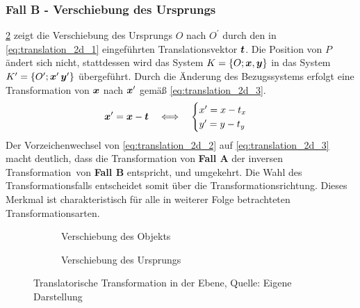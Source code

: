 \subsubsection{Fall B - Verschiebung des Ursprungs}
\cref{fig:translation_2d_b} zeigt die Verschiebung des Ursprungs $O$ nach $O^\prime$ durch den in \cref{eq:translation_2d_1} eingeführten Translationsvektor $\boldsymbol{t}$. Die Position von $P$ ändert sich nicht, stattdessen wird das System $K = \{O;\boldsymbol{x},\boldsymbol{y}\}$ in das System $K^\prime = \{O^\prime;\boldsymbol{x}^\prime\,\boldsymbol{y}^\prime\}$ übergeführt. Durch die Änderung des Bezugssystems erfolgt eine Transformation von $\boldsymbol{x}$ nach $\boldsymbol{x}^\prime$ gemäß \cref{eq:translation_2d_3}.
\begin{equation}
    \boldsymbol{x}^\prime = \boldsymbol{x}-\boldsymbol{t} 
    \quad\Longleftrightarrow\quad
    \begin{cases}
        x^\prime=x-t_{x}\\
        y^\prime=y-t_{y}
    \end{cases}
    \label{eq:translation_2d_3}
\end{equation}
Der Vorzeichenwechsel von \cref{eq:translation_2d_2} auf \cref{eq:translation_2d_3} macht deutlich, dass die Transformation von \textbf{Fall A} der \glqq inversen Transformation\grqq\ von \textbf{Fall B} entspricht, und umgekehrt. Die Wahl des Transformationsfalls entscheidet somit über die Transformationsrichtung. Dieses Merkmal ist charakteristisch für alle in weiterer Folge betrachteten Transformationsarten.
\begin{figure}[H]
    \centering
    \begin{subfigure}[b]{0.45\textwidth}
        
        \caption{Verschiebung des Objekts}\label{fig:translation_2d_a}
    \end{subfigure}
    \begin{subfigure}[b]{0.45\textwidth}
        
        \caption{Verschiebung des Ursprungs}\label{fig:translation_2d_b}
    \end{subfigure}
    \caption[Translatorische Transformation in der Ebene]{Translatorische Transformation in der Ebene, Quelle: Eigene Darstellung}\label{fig:translation_2d}
\end{figure}
\newpage
